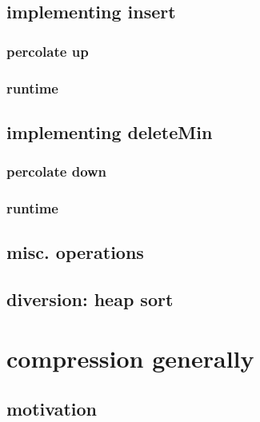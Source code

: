 

\subsection{implementing insert}



\subsubsection{percolate up}




\subsubsection{runtime}



\subsection{implementing deleteMin}

\subsubsection{percolate down}

\subsubsection{runtime}

\subsection{misc. operations}

\subsection{diversion: heap sort}

\section{compression generally} 

\subsection{motivation}

